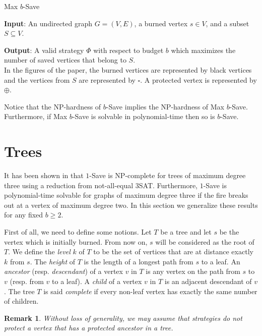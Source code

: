 \documentclass[10pt]{article}
\newtheorem{remark}{Remark}
\begin{document}
\medskip
\noindent 
{\sc Max $b$-Save}

\noindent\textbf{Input}: An undirected graph $G=(V,E)$, a burned vertex $s\in V$, and a subset $S \subseteq V$.

\noindent\textbf{Output}: A valid strategy $\Phi$  with respect to budget $b$ which maximizes the number of saved vertices that belong to $S$.\\


In the figures of the paper, the burned vertices are represented by  black vertices and the vertices from $S$ are represented by $\square$. A protected vertex is represented by $\oplus$.

\medskip

Notice that the NP-hardness of {\sc $b$-Save} implies the NP-hardness of {\sc Max $b$-Save}. Furthermore, if {\sc Max $b$-Save} is solvable in polynomial-time then so is {\sc $b$-Save}.





\section{Trees} \label{s:trees}


It has been shown in \cite{finbow2007} that {\sc $1$-Save} is NP-complete for trees of maximum degree three using a reduction from not-all-equal 3SAT. Furthermore, {\sc $1$-Save} is polynomial-time solvable for graphs of maximum degree three if the fire breaks out at a vertex of maximum degree two. In this section we generalize these results for any fixed $b\geq 2$.

First of all, we need to define some notions. Let $T$ be a tree and let $s$ be the vertex which is initially burned. From now on, $s$ will be considered as the root of $T$. We define the \textit{level} $k$ of $T$ to be the set of vertices that are at distance exactly $k$ from $s$. The \textit{height} of $T$ is the length of a longest path from $s$ to a leaf. An \textit{ancestor} (resp. \textit{descendant}) of a vertex $v$ in $T$ is any vertex on the path from $s$ to $v$ (resp. from $v$ to a leaf). A \textit{child} of a vertex $v$ in $T$ is an adjacent descendant of $v$. The tree $T$ is said \textit{complete} if every non-leaf vertex has exactly the same number of children.

\begin{remark}
\label{rem:relstrat}
Without loss of generality, we may assume that strategies do not protect a vertex that has a protected ancestor in a tree.
\end{remark}
\end{document}

